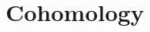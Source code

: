 \documentclass{../util/zariski}
\begin{document}
\section{Cohomology}

%


\printbibliography
\end{document}
